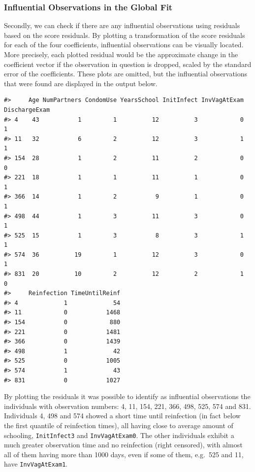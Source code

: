 \documentclass[
]{article}
\begin{document}
\hypertarget{influential-observations-in-the-global-fit}{%
\subsubsection{Influential Observations in the Global Fit}\label{influential-observations-in-the-global-fit}}

Secondly, we can check if there are any influential observations using residuals based on the score residuals. By plotting a transformation of the score residuals for each of the four coefficients, influential observations can be visually located. More precisely, each plotted residual would be the approximate change in the coefficient vector if the observation in question is dropped, scaled by the standard error of the coefficients. These plots are omitted, but the influential observations that were found are displayed in the output below.

\begin{verbatim}
#>     Age NumPartners CondomUse YearsSchool InitInfect InvVagAtExam DischargeExam
#> 4    43           1         1          12          3            0             1
#> 11   32           6         2          12          3            1             1
#> 154  28           1         2          11          2            0             0
#> 221  18           1         1          11          1            0             1
#> 366  14           1         2           9          1            0             1
#> 498  44           1         3          11          3            0             1
#> 525  15           1         3           8          3            1             1
#> 574  36          19         1          12          3            0             1
#> 831  20          10         2          12          2            1             0
#>     Reinfection TimeUntilReinf
#> 4             1             54
#> 11            0           1468
#> 154           0            880
#> 221           0           1481
#> 366           0           1439
#> 498           1             42
#> 525           0           1005
#> 574           1             43
#> 831           0           1027
\end{verbatim}

By plotting the residuals it was possible to identify as influential observations the individuals with observation numbers: 4, 11, 154, 221, 366, 498, 525, 574 and 831. Individuals 4, 498 and 574 showed a short time until reinfection (in fact below the first quantile of reinfection times), all having close to average amount of schooling, \texttt{InitInfect3} and \texttt{InvVagAtExam0}. The other individuals exhibit a much greater observation time and no reinfection (right censored), with almost all of them having more than 1000 days, even if some of them, e.g.~525 and 11, have \texttt{InvVagAtExam1}.
\end{document}
